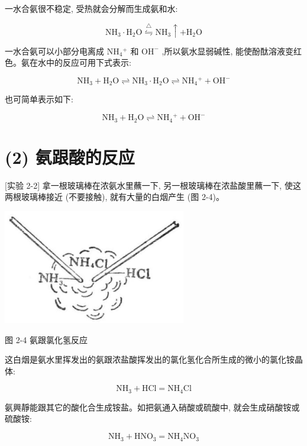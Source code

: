 \documentclass[10pt]{article}
\begin{document}
一水合氨很不稳定, 受热就会分解而生成氨和水:

\[
{\mathrm{{NH}}}_{3} \cdot {\mathrm{H}}_{2}\mathrm{O}\overset{\bigtriangleup }{ \leftrightharpoons }{\mathrm{{NH}}}_{3} \uparrow + {\mathrm{H}}_{2}\mathrm{O}
\]

一水合氨可以小部分电离成 \({\mathrm{{NH}}}_{4}{}^{ + }\) 和 \({\mathrm{{OH}}}^{ - }\) ,所以氨水显弱碱性, 能使酚酞溶液变红色。氨在水中的反应可用下式表示:

\[
{\mathrm{{NH}}}_{3} + {\mathrm{H}}_{2}\mathrm{O} \rightleftharpoons {\mathrm{{NH}}}_{3} \cdot {\mathrm{H}}_{2}\mathrm{O} \rightleftharpoons {\mathrm{{NH}}}_{4}{}^{ + } + {\mathrm{{OH}}}^{ - }
\]

也可简单表示如下:

\[
{\mathrm{{NH}}}_{3} + {\mathrm{H}}_{2}\mathrm{O} \rightleftharpoons {\mathrm{{NH}}}_{4}{}^{ + } + {\mathrm{{OH}}}^{ - }
\]

\section*{(2) 氨跟酸的反应}

[实验 2-2] 拿一根玻璃棒在浓氨水里蘸一下, 另一根玻璃棒在浓盐酸里蘸一下, 使这两根玻璃棒接近 (不要接触), 就有大量的白烟产生 (图 2-4)。

\begin{center}
\includegraphics[max width=0.6\textwidth]{images/01912d13-9986-7822-a012-3f3f7be99dcb_43_436028.jpg}
\end{center}

图 2-4 氨跟氯化氢反应

这白烟是氨水里挥发出的氨跟浓盐酸挥发出的氯化氢化合所生成的微小的氯化铵晶体:

\[
{\mathrm{{NH}}}_{3} + \mathrm{{HCl}} = {\mathrm{{NH}}}_{4}\mathrm{{Cl}}
\]

氨興靜能跟其它的酸化合生成铵盐。如把氨通入硝酸或硫酸中, 就会生成硝酸铵或硫酸铵:

\[
{\mathrm{{NH}}}_{3} + {\mathrm{{HNO}}}_{3} = {\mathrm{{NH}}}_{4}{\mathrm{{NO}}}_{3}
\]
\end{document}
